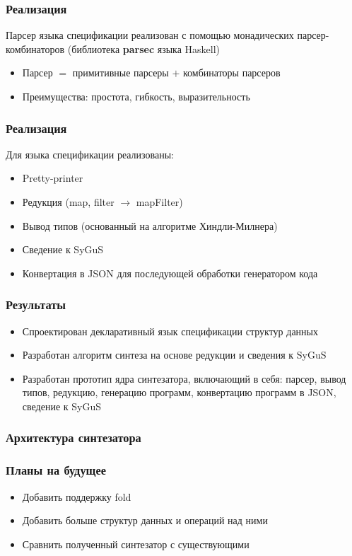 \documentclass[14pt]{beamer}
\begin{document}
\begin{frame}
\frametitle{Реализация}
Парсер языка спецификации реализован с помощью монадических парсер-комбинаторов (библиотека \textbf{parsec} языка Haskell)
\begin{itemize}
    \item Парсер $=$ примитивные парсеры $+$ комбинаторы парсеров
    \item Преимущества: простота, гибкость, выразительность
\end{itemize}
\end{frame}


\begin{frame}
\frametitle{Реализация}
Для языка спецификации реализованы:
\begin{itemize}
    \item Pretty-printer
    \item Редукция (map, filter $\to$ mapFilter)
    \item Вывод типов (основанный на алгоритме Хиндли-Милнера)
    \item Сведение к SyGuS
    \item Конвертация в JSON для последующей обработки генератором кода
\end{itemize}
\end{frame}


\begin{frame}
\frametitle{Результаты}
\begin{itemize}
    \item Спроектирован декларативный язык спецификации структур данных
    \item Разработан алгоритм синтеза на основе редукции и сведения к SyGuS
    \item Разработан прототип ядра синтезатора, включающий в себя: парсер, вывод типов, редукцию, генерацию программ, конвертацию программ в JSON, сведение к SyGuS
\end{itemize}
\end{frame}

\begin{frame}
\frametitle{Архитектура синтезатора}
\begin{center}
\end{center}
\end{frame}


\begin{frame}
\frametitle{Планы на будущее}
\begin{itemize}
    \item Добавить поддержку fold
    \item Добавить больше структур данных и операций над ними
    \item Сравнить полученный синтезатор с существующими
\end{itemize}
\end{frame}
\end{document}
